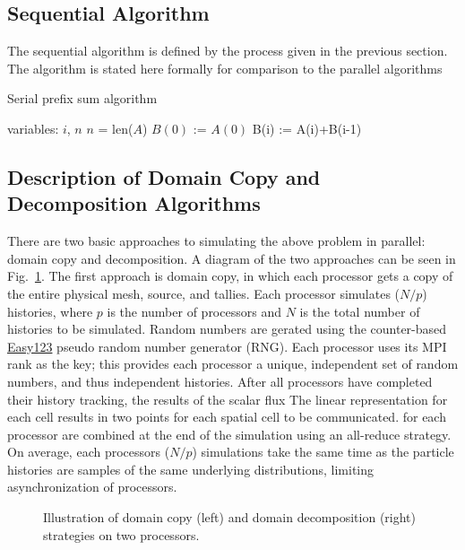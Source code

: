\documentclass[12pt]{article}
\renewcommand{\SS}{\State}
\begin{document}
\subsection{Sequential Algorithm}

The sequential algorithm is defined by the process given in the previous section.  The algorithm is stated
here formally for comparison to the parallel algorithms
\begin{algorithm}
\begin{algorithmic}
    \caption{Serial prefix sum algorithm\label{alg:1}}
 
    \State variables: $i$, $n$
    \State $n$ = len($A$)
    \State $B(0)$ := $A(0)$ 
        \SS B(i) := A(i)+B(i-1)
    \EndFor
\EndProcedure
\end{algorithmic}


\subsection{Description of Domain Copy and Decomposition Algorithms}

There are two basic approaches to simulating the above problem in parallel: domain
copy and decomposition.   A diagram of the two approaches can
be seen in Fig.~\ref{hawt}.  The first approach
is domain copy, in which each processor gets a copy of the entire physical mesh,
source, and tallies. Each processor simulates ($N/p$) histories, where $p$ is the
number of processors and $N$ is the total number of histories to be simulated. Random
numbers are gerated using the counter-based
\href{http://www.thesalmons.org/john/random123/papers/random123sc11.pdf}{Easy123}
pseudo random number generator (RNG).  Each processor uses its MPI rank as the key;
this provides each processor a unique, independent set of random numbers, and thus
independent histories.  After all processors have completed their history tracking,
the results of the scalar flux The linear representation for each cell results in two
points for each spatial cell to be communicated.  for each processor are 
combined at the end of the simulation using an all-reduce strategy.  On average, each processors ($N/p$)
simulations take the same time as the particle histories are samples of the same
underlying distributions, limiting
asynchronization of processors.  
    \begin{figure}
    \centering
    \def\svgwidth{0.9\textwidth}
    
    \caption{Illustration of domain copy (left) and domain decomposition (right)
        strategies on two processors. \label{hawt}}
    \end{figure}


\end{algorithm}
\end{document}
